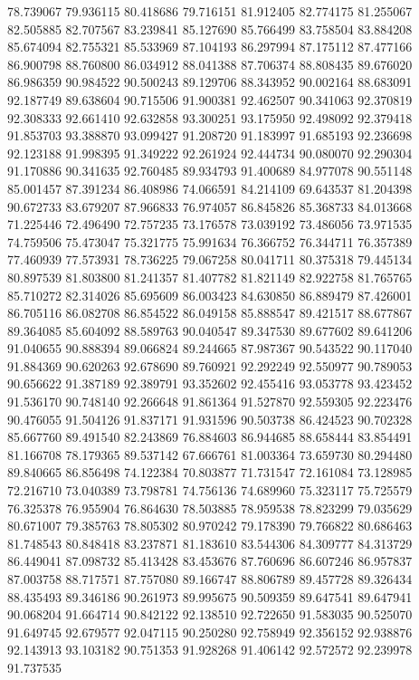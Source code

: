 78.739067
79.936115
80.418686
79.716151
81.912405
82.774175
81.255067
82.505885
82.707567
83.239841
85.127690
85.766499
83.758504
83.884208
85.674094
82.755321
85.533969
87.104193
86.297994
87.175112
87.477166
86.900798
88.760800
86.034912
88.041388
87.706374
88.808435
89.676020
86.986359
90.984522
90.500243
89.129706
88.343952
90.002164
88.683091
92.187749
89.638604
90.715506
91.900381
92.462507
90.341063
92.370819
92.308333
92.661410
92.632858
93.300251
93.175950
92.498092
92.379418
91.853703
93.388870
93.099427
91.208720
91.183997
91.685193
92.236698
92.123188
91.998395
91.349222
92.261924
92.444734
90.080070
92.290304
91.170886
90.341635
92.760485
89.934793
91.400689
84.977078
90.551148
85.001457
87.391234
86.408986
74.066591
84.214109
69.643537
81.204398
90.672733
83.679207
87.966833
76.974057
86.845826
85.368733
84.013668
71.225446
72.496490
72.757235
73.176578
73.039192
73.486056
73.971535
74.759506
75.473047
75.321775
75.991634
76.366752
76.344711
76.357389
77.460939
77.573931
78.736225
79.067258
80.041711
80.375318
79.445134
80.897539
81.803800
81.241357
81.407782
81.821149
82.922758
81.765765
85.710272
82.314026
85.695609
86.003423
84.630850
86.889479
87.426001
86.705116
86.082708
86.854522
86.049158
85.888547
89.421517
88.677867
89.364085
85.604092
88.589763
90.040547
89.347530
89.677602
89.641206
91.040655
90.888394
89.066824
89.244665
87.987367
90.543522
90.117040
91.884369
90.620263
92.678690
89.760921
92.292249
92.550977
90.789053
90.656622
91.387189
92.389791
93.352602
92.455416
93.053778
93.423452
91.536170
90.748140
92.266648
91.861364
91.527870
92.559305
92.223476
90.476055
91.504126
91.837171
91.931596
90.503738
86.424523
90.702328
85.667760
89.491540
82.243869
76.884603
86.944685
88.658444
83.854491
81.166708
78.179365
89.537142
67.666761
81.003364
73.659730
80.294480
89.840665
86.856498
74.122384
70.803877
71.731547
72.161084
73.128985
72.216710
73.040389
73.798781
74.756136
74.689960
75.323117
75.725579
76.325378
76.955904
76.864630
78.503885
78.959538
78.823299
79.035629
80.671007
79.385763
78.805302
80.970242
79.178390
79.766822
80.686463
81.748543
80.848418
83.237871
81.183610
83.544306
84.309777
84.313729
86.449041
87.098732
85.413428
83.453676
87.760696
86.607246
86.957837
87.003758
88.717571
87.757080
89.166747
88.806789
89.457728
89.326434
88.435493
89.346186
90.261973
89.995675
90.509359
89.647541
89.647941
90.068204
91.664714
90.842122
92.138510
92.722650
91.583035
90.525070
91.649745
92.679577
92.047115
90.250280
92.758949
92.356152
92.938876
92.143913
93.103182
90.751353
91.928268
91.406142
92.572572
92.239978
91.737535
